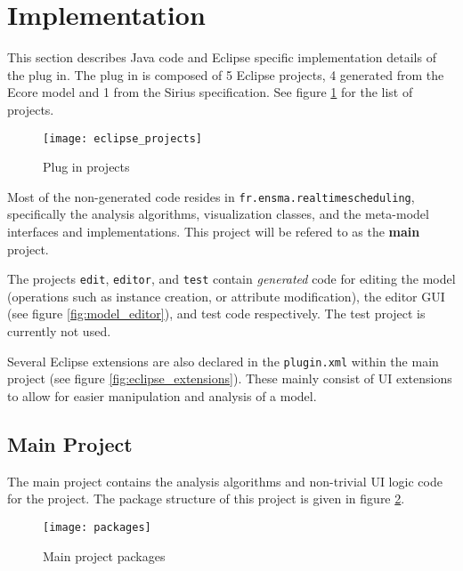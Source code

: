 \pagebreak
\section{Implementation}
This section describes Java code and Eclipse specific implementation details
of the plug in. The plug in is composed of 5 Eclipse projects, 4 generated from
the Ecore model and 1 from the Sirius specification. See figure \ref{fig:projects}
for the list of projects.

\begin{figure}[H]
    \centering
    \texttt{[image: eclipse\_projects]}
    \caption{Plug in projects}
    \label{fig:projects}
\end{figure}

Most of the non-generated code resides in \texttt{fr.ensma.realtimescheduling},
specifically the analysis algorithms, visualization classes, and the meta-model
interfaces and implementations. This project will be refered to as the
\textbf{main} project.

The projects \texttt{edit}, \texttt{editor}, and \texttt{test} contain
\textit{generated} code for editing the model
(operations such as instance creation, or attribute modification),
the editor GUI (see figure \ref{fig:model_editor}), and test code respectively.
The test project is currently not used.

Several Eclipse extensions are also declared in the \texttt{plugin.xml}
within the main project (see figure \ref{fig:eclipse_extensions}). These
mainly consist of UI extensions to allow for easier manipulation and analysis
of a model.

\subsection{Main Project}
The main project contains the analysis algorithms and non-trivial UI logic code for the 
project. The package structure of this project is given in figure \ref{fig:packages}.
\begin{figure}[H]
    \centering
    \texttt{[image: packages]}
    \caption{Main project packages}
    \label{fig:packages}
\end{figure}



